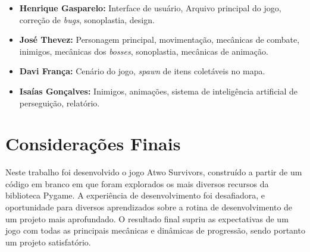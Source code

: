 \documentclass[a4paper,12pt]{article}
\begin{document}
\begin{itemize}
    \item \textbf{Henrique Gasparelo:} Interface de usuário, Arquivo principal do jogo, correção de \textit{bugs}, sonoplastia, design.
    \item \textbf{José Thevez:} Personagem principal, movimentação, mecânicas de combate, inimigos, mecânicas dos \textit{bosses}, sonoplastia, mecânicas de animação.
    \item \textbf{Davi França:} Cenário do jogo, \textit{spawn} de itens coletáveis no mapa.
    \item \textbf{Isaías Gonçalves:} Inimigos, animações, sistema de inteligência artificial de perseguição, relatório.
\end{itemize} 




\section{Considerações Finais}

Neste trabalho foi desenvolvido o jogo Atwo Survivors, construído a partir de um código em branco em que foram explorados os mais diversos recursos da biblioteca Pygame. A experiência de desenvolvimento foi desafiadora, e oportunidade para diversos aprendizados sobre a rotina de desenvolvimento de um projeto mais aprofundado. O resultado final supriu as expectativas de um jogo com todas as principais mecânicas e dinâmicas de progressão, sendo portanto um projeto satisfatório. 



\end{document}
